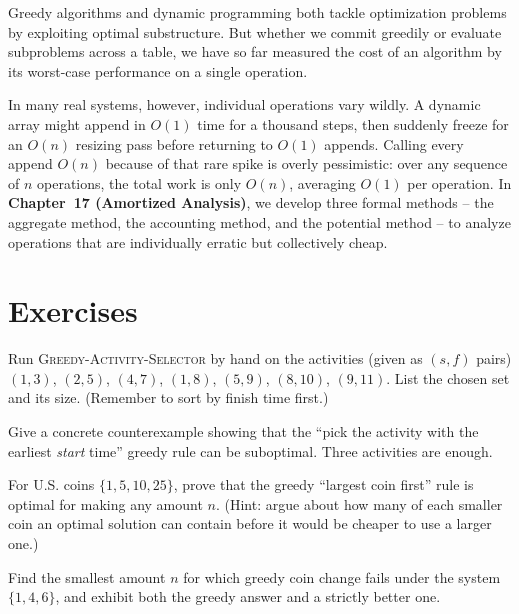 Greedy algorithms and dynamic programming both tackle optimization problems by
exploiting optimal substructure. But whether we commit greedily or evaluate
subproblems across a table, we have so far measured the cost of an algorithm by its
worst-case performance on a single operation.

In many real systems, however, individual operations vary wildly. A dynamic array
might append in $O(1)$ time for a thousand steps, then suddenly freeze for an $O(n)$
resizing pass before returning to $O(1)$ appends. Calling every append $O(n)$ because
of that rare spike is overly pessimistic: over any sequence of $n$ operations, the
total work is only $O(n)$, averaging $O(1)$ per operation. In \textbf{Chapter~17
(Amortized Analysis)}, we develop three formal methods -- the aggregate method, the
accounting method, and the potential method -- to analyze operations that are
individually erratic but collectively cheap.

\section*{Exercises}

\begin{exercise}
Run \textsc{Greedy-Activity-Selector} by hand on the activities (given as
$(s,f)$ pairs) $(1,3)$, $(2,5)$, $(4,7)$, $(1,8)$, $(5,9)$, $(8,10)$, $(9,11)$.
List the chosen set and its size. (Remember to sort by finish time first.)
\end{exercise}

\begin{exercise}
Give a concrete counterexample showing that the ``pick the activity with the
earliest \emph{start} time'' greedy rule can be suboptimal. Three activities are
enough.
\end{exercise}

\begin{exercise}
For U.S. coins $\{1, 5, 10, 25\}$, prove that the greedy ``largest coin first''
rule is optimal for making any amount $n$. (Hint: argue about how many of each
smaller coin an optimal solution can contain before it would be cheaper to use a
larger one.)
\end{exercise}

\begin{exercise}
Find the smallest amount $n$ for which greedy coin change fails under the system
$\{1, 4, 6\}$, and exhibit both the greedy answer and a strictly better one.
\end{exercise}


